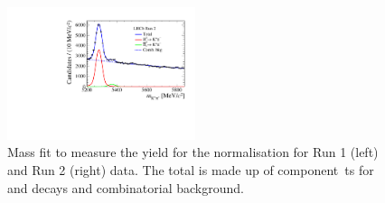 {\begin{figure}[tbp]
       \includegraphics[width=0.49\textwidth]{./Figs/BFAnalysis/Bd2KPi_mass_RunII_BDTbinNone.pdf}
    \caption{Mass fit to measure the \bdkpi yield for the normalisation for Run 1 (left) and Run 2 (right) data. The total \pdf is made up of component\
ts for \bdkpi and \bskpi decays and combinatorial background.}
    \label{fig:Bdkpiyield}
\end{figure}

}
